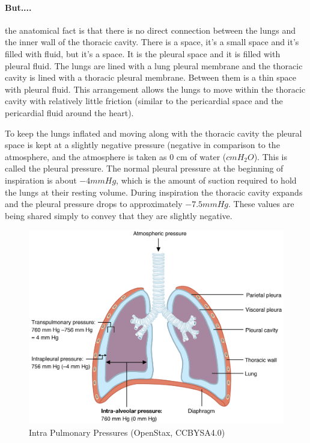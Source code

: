 \paragraph{But....} the anatomical fact is that there is no direct connection between the lungs and the inner wall of the thoracic cavity. There is a space, it's a small space and it's filled with fluid, but it's a space. It is the pleural space and it is filled with pleural fluid. The lungs are lined with a lung pleural membrane and the thoracic cavity is lined with a thoracic pleural membrane. Between them is a thin space with pleural fluid. This arrangement allows the lungs to move within the thoracic cavity with relatively little friction (similar to the pericardial space and the pericardial fluid around the heart). 

To keep the lungs inflated and moving along with the thoracic cavity the pleural space is kept at a slightly negative pressure (negative in comparison to the atmosphere, and the atmosphere is taken as 0 cm of water ($cm H_2O$)\footnotemark{}. This is called the pleural pressure. The normal pleural pressure at the beginning of inspiration is about $-4 mmHg$, which is the amount of suction required to hold the lungs at their resting volume. During inspiration the thoracic cavity expands and the pleural pressure drops to approximately  $-7.5 mmHg$. These values are being shared simply to convey that they are slightly negative. 

\begin{figure}
    \centering
    \includegraphics[width = 0.6 \linewidth]{./figure/ventilation/intrapulmonaryPressures.jpg}
    \caption{Intra Pulmonary Pressures \footnotesize{(OpenStax, CCBYSA4.0)}}
    \label{fig:intrapulmonaryPressures}
\end{figure}

